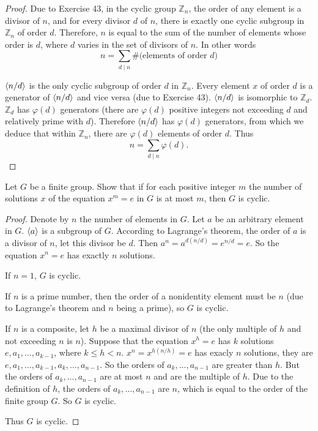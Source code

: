 \begin{proof}
    Due to Exercise 43, in the cyclic group $\mathbb{Z}_{n}$, the order of any element is a divisor of $n$, and for every divisor $d$ of $n$, there is exactly one cyclic subgroup in $\mathbb{Z}_{n}$ of order $d$. Therefore, $n$ is equal to the sum of the number of elements whose order is $d$, where $d$ varies in the set of divisors of $n$. In other words
    \[
        n = \sum_{d \mid n}\#\text{(elements of order $d$)}
    \]

    $\left\langle{n/d}\right\rangle$ is the only cyclic subgroup of order $d$ in $\mathbb{Z}_{n}$. Every element $x$ of order $d$ is a generator of $\left\langle{n/d}\right\rangle$ and vice versa (due to Exercise 43). $\left\langle{n/d}\right\rangle$ is isomorphic to $\mathbb{Z}_{d}$. $\mathbb{Z}_{d}$ has $\varphi(d)$ generators (there are $\varphi(d)$ positive integers not exceeding $d$ and relatively prime with $d$). Therefore $\left\langle{n/d}\right\rangle$ has $\varphi(d)$ generators, from which we deduce that within $\mathbb{Z}_{n}$, there are $\varphi(d)$ elements of order $d$. Thus
    \[
        n = \sum_{d \mid n}\varphi(d).
    \]
\end{proof}

\newpage
\begin{exercise}
    Let $G$ be a finite group. Show that if for each positive integer $m$ the number of solutions $x$ of the equation $x^{m} = e$ in $G$ is at most $m$, then $G$ is cyclic.
\end{exercise}

\begin{proof}
    Denote by $n$ the number of elements in $G$. Let $a$ be an arbitrary element in $G$. $\left\langle{a}\right\rangle$ is a subgroup of $G$. According to Lagrange's theorem, the order of $a$ is a divisor of $n$, let this divisor be $d$. Then $a^{n} = a^{d(n/d)} = e^{n/d} = e$. So the equation $x^{n} = e$ has exactly $n$ solutions.

    If $n = 1$, $G$ is cyclic.

    If $n$ is a prime number, then the order of a nonidentity element must be $n$ (due to Lagrange's theorem and $n$ being a prime), so $G$ is cyclic.

    If $n$ is a composite, let $h$ be a maximal divisor of $n$ (the only multiple of $h$ and not exceeding $n$ is $n$). Suppose that the equation $x^{h} = e$ has $k$ solutions $e, a_{1}, \ldots, a_{k-1}$, where $k\leq h < n$. $x^{n} = x^{h(n/h)} = e$ has exacly $n$ solutions, they are $e, a_{1}, \ldots, a_{k-1}, a_{k}, \ldots, a_{n-1}$. So the orders of $a_{k}, \ldots, a_{n-1}$ are greater than $h$. But the orders of $a_{k}, \ldots, a_{n-1}$ are at most $n$ and are the multiple of $h$. Due to the definition of $h$, the orders of $a_{k}, \ldots, a_{n-1}$ are $n$, which is equal to the order of the finite group $G$. So $G$ is cyclic.

    Thus $G$ is cyclic.
\end{proof}

